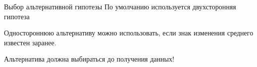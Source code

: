 \documentclass[11pt,pdf,utf8,hyperref={unicode},aspectratio=169]{beamer}
\begin{document}
\begin{frame}{Выбор альтернативной гипотезы}
\centering
\large
По умолчанию используется двухсторонняя гипотеза

\bigskip

Одностороннюю альтернативу можно использовать, если знак изменения среднего известен заранее.

\bigskip

\alert{Альтернатива должна выбираться до получения данных!}
\end{frame}
\end{document}
